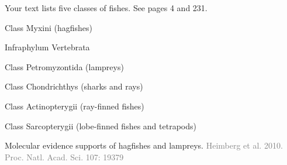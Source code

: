 \documentclass[t,handout]{beamer}  %
\begin{document}
\begin{frame}[t,plain]{Your text lists five classes of fishes. {\small See pages 4 and 231.}}

	\hspace{5em} Class Myxini (hagfishes)
	
	\hspace{4em} {\small Infraphylum Vertebrata}

	\hspace{5em} Class Petromyzontida (lampreys)

	\hspace{5em} Class Chondrichthys (sharks and rays)

	\hspace{5em} Class Actinopterygii (ray-finned fishes)

	\hspace{5em} Class Sarcopterygii (lobe-finned fishes and tetrapods)
	
	\hangpara{}
	
\end{frame}

{
\begin{frame}[b,plain]{Molecular evidence supports  of hagfishes and lampreys.}
	\hfill\textcolor{gray}{Heimberg et al. 2010. Proc. Natl. Acad. Sci. 107:  19379}
\end{frame}
}
\end{document}
